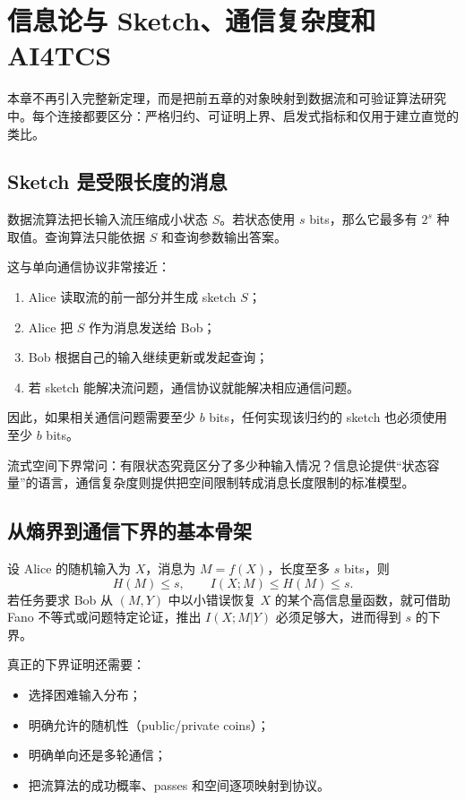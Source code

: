 \chapter{信息论与 Sketch、通信复杂度和 AI4TCS}

本章不再引入完整新定理，而是把前五章的对象映射到数据流和可验证算法研究中。每个连接都要区分：严格归约、可证明上界、启发式指标和仅用于建立直觉的类比。

\section{Sketch 是受限长度的消息}

数据流算法把长输入流压缩成小状态 $S$。若状态使用 $s$ bits，那么它最多有 $2^s$ 种取值。查询算法只能依据 $S$ 和查询参数输出答案。

这与单向通信协议非常接近：
\begin{enumerate}
  \item Alice 读取流的前一部分并生成 sketch $S$；
  \item Alice 把 $S$ 作为消息发送给 Bob；
  \item Bob 根据自己的输入继续更新或发起查询；
  \item 若 sketch 能解决流问题，通信协议就能解决相应通信问题。
\end{enumerate}
因此，如果相关通信问题需要至少 $b$ bits，任何实现该归约的 sketch 也必须使用至少 $b$ bits。

\begin{intuitionbox}
流式空间下界常问：有限状态究竟区分了多少种输入情况？信息论提供“状态容量”的语言，通信复杂度则提供把空间限制转成消息长度限制的标准模型。
\end{intuitionbox}

\section{从熵界到通信下界的基本骨架}

设 Alice 的随机输入为 $X$，消息为 $M=f(X)$，长度至多 $s$ bits，则
\[
H(M)\le s,
\qquad
I(X;M)\le H(M)\le s.
\]
若任务要求 Bob 从 $(M,Y)$ 中以小错误恢复 $X$ 的某个高信息量函数，就可借助 Fano 不等式或问题特定论证，推出 $I(X;M|Y)$ 必须足够大，进而得到 $s$ 的下界。

真正的下界证明还需要：
\begin{itemize}
  \item 选择困难输入分布；
  \item 明确允许的随机性（public/private coins）；
  \item 明确单向还是多轮通信；
  \item 把流算法的成功概率、passes 和空间逐项映射到协议。
\end{itemize}

